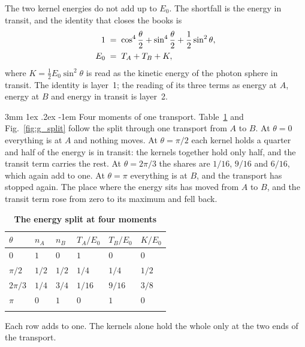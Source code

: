 \documentclass[%
 reprint, amsmath,amssymb, aps, prb, ]{revtex4-2}
\makeatletter
\numberwithin{equation}{section}
\renewcommand\paragraph{%
  \@startsection{paragraph}{4}{\z@}%
    {3mm \@plus 1ex \@minus .2ex}%
    {-1em}%
    {\normalfont\normalsize\itshape}}
\newcommand{\iphase}{\theta}
\makeatother
\begin{document}
The two kernel energies do not add up to $E_0$. The shortfall is the energy in transit, and the identity that closes the books is
\begin{align}
1 &\;=\; \cos^{4}\frac{\iphase}{2} + \sin^{4}\frac{\iphase}{2} + \frac12\sin^{2}\iphase,
\notag\\
E_0 &\;=\; T_A + T_B + K,
\label{eq:g_identity}
\end{align}
where $K = \tfrac12 E_0\sin^{2}\iphase$ is read as the kinetic energy of the photon sphere in transit. The identity is layer~1; the reading of its three terms as energy at $A$, energy at $B$ and energy in transit is layer~2.

\paragraph{Four moments of one transport.} Table~\ref{tab:g_states} and Fig.~\ref{fig:g_split} follow the split through one transport from $A$ to $B$. At $\iphase = 0$ everything is at $A$ and nothing moves. At $\iphase = \pi/2$ each kernel holds a quarter and half of the energy is in transit: the kernels together hold only half, and the transit term carries the rest. At $\iphase = 2\pi/3$ the shares are $1/16$, $9/16$ and $6/16$, which again add to one. At $\iphase = \pi$ everything is at $B$, and the transport has stopped again. The place where the energy sits has moved from $A$ to $B$, and the transit term rose from zero to its maximum and fell back.

\begin{table}[t!]
\centering
\caption{\textbf{The energy split at four moments}}
\label{tab:g_states}
\renewcommand{\arraystretch}{1.4}
\begin{tabular}{p{1.1cm}p{1.0cm}p{1.0cm}p{1.1cm}p{1.1cm}p{1.0cm}}
\toprule
$\iphase$ & $n_A$ & $n_B$ & $T_A/E_0$ & $T_B/E_0$ & $K/E_0$ \\
\midrule
$0$ & $1$ & $0$ & $1$ & $0$ & $0$ \\
\addlinespace[0.2cm]
$\pi/2$ & $1/2$ & $1/2$ & $1/4$ & $1/4$ & $1/2$ \\
\addlinespace[0.2cm]
$2\pi/3$ & $1/4$ & $3/4$ & $1/16$ & $9/16$ & $3/8$ \\
\addlinespace[0.2cm]
$\pi$ & $0$ & $1$ & $0$ & $1$ & $0$ \\
\addlinespace[0.2cm]
\bottomrule
\end{tabular}
\vspace{0.2cm}
\begin{minipage}{0.95\columnwidth}
\justifying\footnotesize
Each row adds to one. The kernels alone hold the whole only at the two ends of the transport.
\end{minipage}
\end{table}
\end{document}
